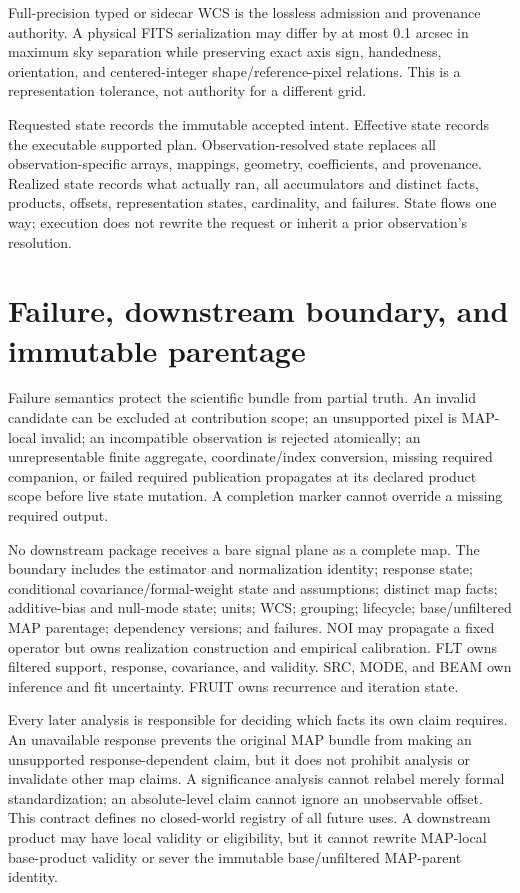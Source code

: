 \documentclass[10pt]{article}
\begin{document}
Full-precision typed or sidecar WCS is the lossless admission and provenance
authority. A physical FITS serialization may differ by at most 0.1 arcsec in
maximum sky separation while preserving exact axis sign, handedness,
orientation, and centered-integer shape/reference-pixel relations. This is a
representation tolerance, not authority for a different grid.

Requested state records the immutable accepted intent. Effective state records
the executable supported plan. Observation-resolved state replaces all
observation-specific arrays, mappings, geometry, coefficients, and provenance.
Realized state records what actually ran, all accumulators and distinct facts,
products, offsets, representation states, cardinality, and failures. State
flows one way; execution does not rewrite the request or inherit a prior
observation's resolution.

\clearpage
\section{Failure, downstream boundary, and immutable parentage}

Failure semantics protect the scientific bundle from partial truth. An
invalid candidate can be excluded at contribution scope; an unsupported pixel
is MAP-local invalid; an incompatible observation is rejected atomically; an
unrepresentable finite aggregate, coordinate/index conversion, missing
required companion, or failed required publication propagates at its declared
product scope before live state mutation. A completion marker cannot override
a missing required output.

No downstream package receives a bare signal plane as a complete map. The
boundary includes the estimator and normalization identity; response state;
conditional covariance/formal-weight state and assumptions; distinct map facts;
additive-bias and null-mode state; units; WCS; grouping; lifecycle;
base/unfiltered MAP parentage; dependency versions; and failures. NOI may propagate a fixed
operator but owns realization construction and empirical calibration. FLT
owns filtered support, response, covariance, and validity. SRC, MODE, and BEAM
own inference and fit uncertainty. FRUIT owns recurrence and iteration state.

Every later analysis is responsible for deciding which facts its own claim
requires. An unavailable response prevents the original MAP bundle from making
an unsupported response-dependent claim, but it does not prohibit analysis or
invalidate other map claims. A significance analysis cannot relabel merely
formal standardization; an absolute-level claim cannot ignore an unobservable
offset. This contract defines no closed-world registry of all future uses. A
downstream product may have local validity or eligibility, but it cannot
rewrite MAP-local base-product validity or sever the immutable base/unfiltered
MAP-parent identity.
\end{document}
